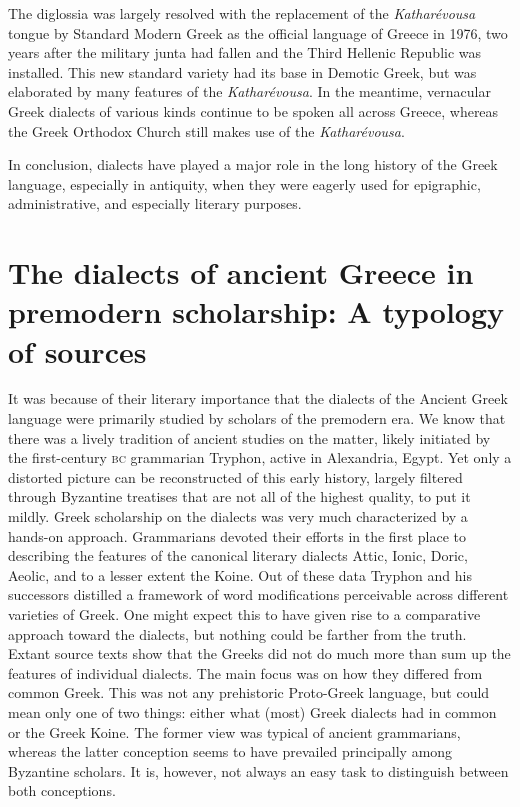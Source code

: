 The diglossia was largely resolved with the replacement of the \textit{Katharévousa} tongue by Standard Modern Greek as the official language of Greece in 1976, two years after the military junta had fallen and the Third Hellenic Republic was installed. This new standard variety had its base in Demotic Greek, but was elaborated by many features of the \textit{Katharévousa}. In the meantime, vernacular Greek dialects of various kinds continue to be spoken all across Greece, whereas the Greek Orthodox Church still makes use of the \textit{Katharévousa}.

In conclusion, dialects have played a major role in the long history of the Greek language, especially in antiquity, when they were eagerly used for epigraphic, administrative, and especially literary purposes.

\section[The dialects of ancient Greece in premodern scholarship]{The dialects of ancient Greece in premodern scholarship: A typology of sources}\label{sec:1.2}

It was because of their literary importance that the dialects of the Ancient Greek language were primarily studied by scholars of the premodern era. We know that there was a lively tradition of ancient studies on the matter, likely initiated by the first-century \textsc{bc} grammarian Tryphon, active in Alexandria, Egypt. Yet only a distorted picture can be reconstructed of this early history, largely filtered through Byzantine treatises that are not all of the highest quality, to put it mildly. Greek scholarship on the dialects was very much characterized by a hands-on approach. Grammarians devoted their efforts in the first place to describing the features of the canonical literary dialects Attic, Ionic, Doric, Aeolic, and to a lesser extent the Koine. Out of these data Tryphon and his successors distilled a framework of word modifications perceivable across different varieties of Greek. One might expect this to have given rise to a comparative approach toward the dialects, but nothing could be farther from the truth. Extant source texts show that the Greeks did not do much more than sum up the features of individual dialects. The main focus was on how they differed from common Greek. This was not any prehistoric Proto-Greek language, but could mean only one of two things: either what (most) Greek dialects had in common or the Greek Koine. The former view was typical of ancient grammarians, whereas the latter conception seems to have prevailed principally among Byzantine scholars. It is, however, not always an easy task to distinguish between both conceptions.


